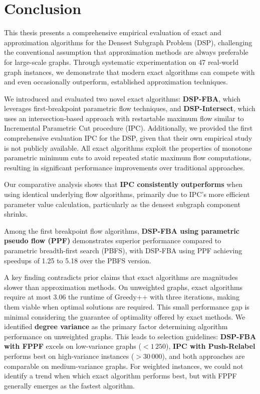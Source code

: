 \chapter[Conclusion]{Conclusion}

This thesis presents a comprehensive empirical evaluation of exact and approximation algorithms for the Densest Subgraph Problem (DSP), challenging the conventional assumption that approximation methods are always preferable for large-scale graphs.
Through systematic experimentation on 47 real-world graph instances, we demonstrate that modern exact algorithms can compete with and even occasionally outperform, established approximation techniques.

We introduced and evaluated two novel exact algorithms:
\textbf{DSP-FBA}, which leverages first-breakpoint parametric flow techniques, and \textbf{DSP-Intersect}, which uses an intersection-based approach with restartable maximum flow similar to \textcite{hochbaum_flow_2024} Incremental Parametric Cut procedure (IPC).
Additionally, we provided the first comprehensive evaluation IPC for the DSP, given that their own empirical study is not publicly available.
All exact algorithms exploit the properties of monotone parametric minimum cuts to avoid repeated static maximum flow computations, resulting in significant performance improvements over traditional approaches.

Our comparative analysis shows that \textbf{IPC consistently outperforms \DSPwithR} when using identical underlying flow algorithms, primarily due to IPC's more efficient parameter value calculation,
particularly as the densest subgraph component shrinks.

Among the first breakpoint flow algorithms, \textbf{DSP-FBA using parametric pseudo flow (PPF)} demonstrates superior performance compared to parametric breadth-first search (PBFS), with DSP-FBA using PPF achieving speedups of 1.25 to 5.18 over the PBFS version.

A key finding contradicts prior claims that exact algorithms are magnitudes slower than approximation methods.
On unweighted graphs, exact algorithms require at most 3.06 the runtime of Greedy++ with three iterations, making them viable when optimal solutions are required.
This small performance gap is minimal considering the guarantee of optimality offered by exact methods.
We identified \textbf{degree variance} as the primary factor determining algorithm performance on unweighted graphs.
This leads to selection guidelines: \textbf{DSP-FBA with FPPF} excels on low-variance graphs ($<1\,250$), \textbf{IPC with Push-Relabel} performs best on high-variance instances ($>30\,000$), and both approaches are comparable on medium-variance graphs.
For weighted instances, we could not identify a trend when which exact algorithm performs best, but {\DSPwithFBA} with FPPF generally emerges as the fastest algorithm.


